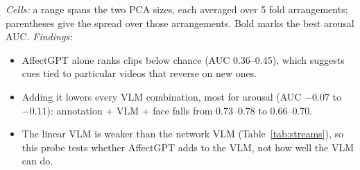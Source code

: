 \documentclass[11pt]{article}
\begin{document}
\begin{table}[!htbp]
{\emph{Cells:} a range spans the two PCA sizes, each averaged over 5 fold arrangements; parentheses give the spread over those arrangements. Bold marks the best arousal AUC.
\emph{Findings:}
\begin{itemize}
  \item AffectGPT alone ranks clips below chance (AUC 0.36--0.45), which suggests cues tied to particular videos that reverse on new ones.
  \item Adding it lowers every VLM combination, most for arousal (AUC $-0.07$ to $-0.11$): annotation + VLM + face falls from 0.73--0.78 to 0.66--0.70.
  \item The linear VLM is weaker than the network VLM (Table~\ref{tab:streams}), so this probe tests whether AffectGPT adds to the VLM, not how well the VLM can do.
\end{itemize}}
\end{table}
\end{document}
